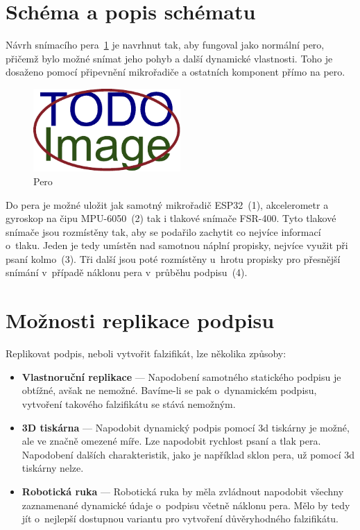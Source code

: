 \section{Schéma a popis schématu}
Návrh snímacího pera~\ref{fig:pero} je navrhnut tak, aby fungoval jako normální pero, 
přičemž bylo možné snímat jeho pohyb a další dynamické vlastnosti.
Toho je dosaženo pomocí připevnění mikrořadiče a ostatních komponent přímo na pero.

\begin{figure}[h]
  \centering
  \includegraphics[width=0.5\textwidth]{obrazky-figures/placeholder.pdf}
  \caption{Pero} 
  \label{fig:pero}
\end{figure}

Do pera je možné uložit jak samotný mikrořadič ESP32~(1), akcelerometr a gyroskop na čipu MPU-6050~(2) tak i tlakové snímače FSR-400.
Tyto tlakové snímače jsou rozmístěny tak, aby se podařilo zachytit co nejvíce informací o~tlaku.
Jeden je tedy umístěn nad samotnou náplní propisky, nejvíce využit při psaní kolmo~(3).
Tři další jsou poté rozmístěny u~hrotu propisky pro přesnější snímání v~případě náklonu pera v~průběhu podpisu~(4). 


\section{Možnosti replikace podpisu}
Replikovat podpis, neboli vytvořit falzifikát, lze několika způsoby:

\begin{itemize}
  \item \textbf{Vlastnoruční replikace} --- 
  Napodobení samotného statického podpisu je obtížné, avšak ne nemožné. 
  Bavíme-li se pak o~dynamickém podpisu, vytvoření takového falzifikátu se stává nemožným.

  \item \textbf{3D tiskárna} ---
  Napodobit dynamický podpis pomocí 3d tiskárny je možné, ale ve značně omezené míře.
  Lze napodobit rychlost psaní a tlak pera. 
  Napodobení dalších charakteristik, jako je například sklon pera, už pomocí 3d tiskárny nelze.

  \item \textbf{Robotická ruka} ---
  Robotická ruka by měla zvládnout napodobit všechny zaznamenané dynamické údaje o~podpisu včetně náklonu pera.
  Mělo by tedy jít o~nejlepší dostupnou variantu pro vytvoření důvěryhodného falzifikátu. 
\end{itemize}

